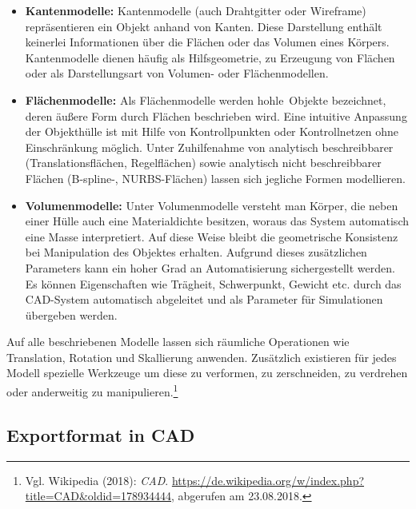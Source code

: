 \begin{itemize}
\item \textbf{Kantenmodelle:} Kantenmodelle (auch Drahtgitter oder Wireframe) repräsentieren ein Objekt anhand von Kanten. Diese Darstellung enthält keinerlei Informationen über die Flächen oder das Volumen eines Körpers. Kantenmodelle dienen häufig als Hilfsgeometrie, zu Erzeugung von Flächen oder als Darstellungsart von Volumen- oder Flächenmodellen.

\item \textbf{Flächenmodelle:} Als Flächenmodelle werden \glqq hohle\grqq\ Objekte bezeichnet, deren äußere Form durch Flächen beschrieben wird. Eine intuitive Anpassung der Objekthülle ist mit Hilfe von Kontrollpunkten oder Kontrollnetzen ohne Einschränkung möglich. Unter Zuhilfenahme von analytisch beschreibbarer (Translationsflächen, Regelflächen) sowie analytisch nicht beschreibbarer Flächen (B-spline-, NURBS-Flächen) lassen sich jegliche Formen modellieren.

\item \textbf{Volumenmodelle:} Unter Volumenmodelle versteht man Körper, die neben einer Hülle auch eine Materialdichte besitzen, woraus das System automatisch eine Masse interpretiert. Auf diese Weise bleibt die geometrische Konsistenz bei Manipulation des Objektes erhalten. Aufgrund dieses zusätzlichen Parameters kann ein hoher Grad an Automatisierung sichergestellt werden. Es können Eigenschaften wie Trägheit, Schwerpunkt, Gewicht etc. durch das CAD-System automatisch abgeleitet und als Parameter für Simulationen übergeben werden.  
\end{itemize}

Auf alle beschriebenen Modelle lassen sich räumliche Operationen wie Translation, Rotation und Skallierung anwenden. Zusätzlich existieren für jedes Modell spezielle Werkzeuge um diese zu verformen, zu zerschneiden, zu verdrehen oder anderweitig zu manipulieren.\footnote{Vgl. Wikipedia  (2018): \textit{CAD}.\newline
\url{https://de.wikipedia.org/w/index.php?title=CAD&oldid=178934444},\newline 
abgerufen am 23.08.2018.} 

\subsection{Exportformat in CAD}
\label{subsec:ExportformatInCAD}

